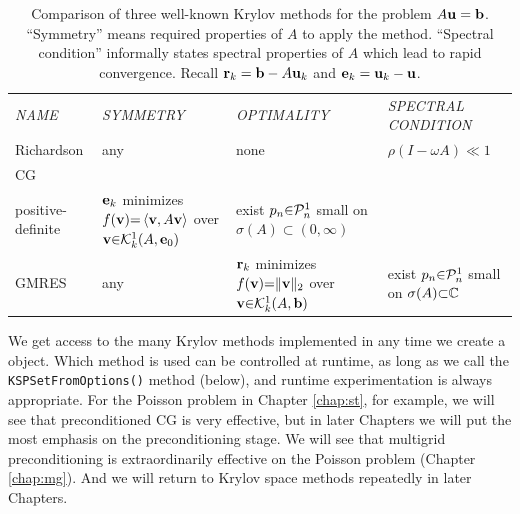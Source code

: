 \newcommand{\mpwide}{27mm}
\bigskip
\begin{table}[h]
\small
\begin{tabular}{llll} \vspace{5mm}
\emph{NAME} & \emph{SYMMETRY} & \emph{OPTIMALITY} & \begin{minipage}[l]{21mm}\emph{SPECTRAL} \emph{CONDITION}\end{minipage} \\ \vspace{5mm}
Richardson & any & none & $\rho(I-\omega A) \ll 1$ \\ \vspace{5mm}
CG & \begin{minipage}[l]{\mpwide}symmetric \\ positive-definite\end{minipage} & \begin{minipage}[l]{25mm}$\mathbf{e}_k$ minimizes $f(\mathbf{v}){=}\left<\mathbf{v},A\mathbf{v}\right>$ over $\mathbf{v}{\in}\mathcal{K}_{k}^1(A,\mathbf{e}_0)$\end{minipage} & \begin{minipage}[l]{\mpwide}exist $p_n{\in}\mathcal{P}_n^1$ small on $\sigma(A){\subset}(0,\infty)$\end{minipage} \\ \vspace{5mm}
GMRES & any & \begin{minipage}[l]{\mpwide}$\mathbf{r}_k$ minimizes $f(\mathbf{v}){=}\|\mathbf{v}\|_2$ over $\mathbf{v}{\in}\mathcal{K}_{k}^1(A,\mathbf{b})$\end{minipage} & \begin{minipage}[l]{\mpwide}exist $p_n{\in}\mathcal{P}_n^1$ small on $\sigma(A){\subset}\mathbb{C}$\end{minipage}
\end{tabular}
\caption{Comparison of three well-known Krylov methods for the problem $A\mathbf{u}=\mathbf{b}$.  ``Symmetry'' means required properties of $A$ to apply the method.  ``Spectral condition'' informally states spectral properties of $A$ which lead to rapid convergence.  Recall $\mathbf{r}_k=\mathbf{b}-A\mathbf{u}_k$ and $\mathbf{e}_k=\mathbf{u}_k-\mathbf{u}$.} \label{tab:krylovcompare}
\end{table}

We get access to the many Krylov methods implemented in \PETSc any time we create a \pKSP object.  Which method is used can be controlled at runtime, as long as we call the \texttt{KSPSetFromOptions()} method (below), and runtime experimentation is always appropriate.  For the Poisson problem in Chapter \ref{chap:st}, for example, we will see that preconditioned CG is very effective, but in later Chapters we will put the most emphasis on the preconditioning stage.  We will see that multigrid preconditioning is extraordinarily effective on the Poisson problem (Chapter \ref{chap:mg}).  And we will return to Krylov space methods repeatedly in later Chapters.

